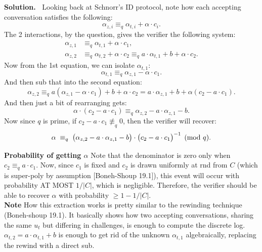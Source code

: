\documentclass[12pt]{article}
\theoremstyle{definition}
\newcommand{\addbigskip}{\addvspace{\bigskipamount}}
\newenvironment{solution}
     {\addbigskip
      \noindent\color{blue}\textbf{Solution.\ }}
     {\par\addbigskip}
\newenvironment{solution}
     {\comment}
     {\endcomment}
\begin{document}
\begin{solution}
Looking back at Schnorr's ID protocol, note how each accepting conversation satisfies the following:
\[
\alpha_{z,i} \equiv_q \alpha_{t,i} + \alpha \cdot c_i.
\]
The 2 interactions, by the question, gives the verifier the following system:
\begin{align}
\alpha_{z,1} &\equiv_q \alpha_{t,1} + \alpha \cdot c_1, \tag{1}\\
\alpha_{z,2} &\equiv_q \alpha_{t,2} + \alpha \cdot c_2
             \equiv_q a\cdot\alpha_{t,1} + b + \alpha \cdot c_2. \tag{2}
\end{align}
Now from the 1st equation, we can isolate $\alpha_{t,1}$:
\[
\alpha_{t,1} \equiv_q \alpha_{z,1} - \alpha \cdot c_1.
\]
And then sub that into the second equation:
\[
\alpha_{z,2} \equiv_q a(\alpha_{z,1} - \alpha \cdot c_1) + b + \alpha \cdot c_2
= a \cdot \alpha_{z,1} + b + \alpha(c_2 - a \cdot c_1).
\]
And then just a bit of rearranging gets:
\[
\alpha \cdot (c_2 - a \cdot c_1) \equiv_q \alpha_{z,2} - a \cdot \alpha_{z,1} - b.
\]
Now since $q$ is prime, if $c_2 - a\cdot c_1 \not\equiv_q 0$, then the verifier will recover:
\[
\alpha \;\equiv_q\; \bigl(\alpha_{z,2} - a\cdot\alpha_{z,1} - b\bigr)
               \cdot \bigl(c_2 - a\cdot c_1\bigr)^{-1} \pmod{q}.\\
\]

\noindent\textbf{Probability of getting $\alpha$}
Note that the denominator is zero only when $c_2 \equiv_q a \cdot c_1$.
Now, since $c_1$ is fixed and $c_2$ is drawn uniformly at rnd from $C$ (which is super-poly by assumption [Boneh-Shoup 19.1]), this event will occur with probability AT MOST $1/|C|$, which is negligible.
Therefore, the verifier should be able to recover $\alpha$ with probability $\geq 1 - 1/|C|$.\\


\noindent\textbf{Note}
How this extraction works is pretty similar to the rewinding technique (Boneh-shoup 19.1).
It basically shows how two accepting conversations, sharing the same $u_t$ but differing in challenges, is enough to compute the discrete log.\\

\noindent
$\alpha_{t,2} = a\cdot\alpha_{t,1}+b$ is enough to get rid of the unknown $\alpha_{t,1}$ algebraically, replacing the rewind with a direct sub.
\end{solution}
\end{document}
